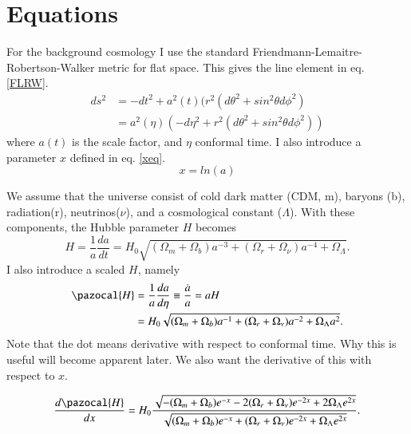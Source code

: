\documentclass{aa}   %
\begin{document}
\section{Equations}\label{sec:Equations}
For the background cosmology I use the standard Friendmann-Lemaitre-Robertson-Walker metric for flat space.
This gives the line element in eq. \ref{FLRW}.
\begin{equation}\label{FLRW}
\begin{aligned}
ds^2 &= -dt^2 +a^2(t)(r^2(d\theta^2+sin^2\theta d\phi^2)\\
     &=a^2(\eta)(-d\eta^2 +r^2(d\theta^2+sin^2\theta d\phi^2))
\end{aligned}
\end{equation}
where $a(t)$ is the scale factor, and $\eta$ conformal time.
I also introduce a parameter $x$ defined in eq. \ref{xeq}.
\begin{equation}\label{xeq}
 x = ln(a)
\end{equation}

We assume that the universe consist of cold dark matter (CDM, m), baryons (b), radiation(r), neutrinos($\nu$), and a cosmological constant ($\Lambda$). 
With these components, the Hubble parameter $H$ becomes
\begin{equation}
 H = \frac{1}{a}\frac{da}{dt} = H_0\sqrt{(\Omega_m+\Omega_b)a^{-3}+(\Omega_r+\Omega_\nu)a^{-4}+\Omega_\Lambda}.
\end{equation}
I also introduce a scaled $H$, namely
\begin{equation}
\begin{aligned}
\pazocal{H} &= \frac{1}{a}\frac{da}{d\eta} \equiv \frac{\dot{a}}{a} = aH\\
&=H_0\sqrt{(\Omega_m+\Omega_b)a^{-1}+(\Omega_r+\Omega_\nu)a^{-2}+\Omega_\Lambda a^2}.
\end{aligned}
\end{equation}
Note that the dot means derivative with respect to conformal time. Why this is useful will become apparent later.
We also want the derivative of this with respect to $x$.

\begin{equation}
 \frac{d\pazocal{H}}{dx} = H_0\frac{\sqrt{-(\Omega_m+\Omega_b)e^{-x}-2(\Omega_r+\Omega_\nu)e^{-2x}+2\Omega_\Lambda e^{2x}}}{\sqrt{(\Omega_m+\Omega_b)e^{-x}+(\Omega_r+\Omega_\nu)e^{-2x}+\Omega_\Lambda e^{2x}}}.
\end{equation}
\end{document}
